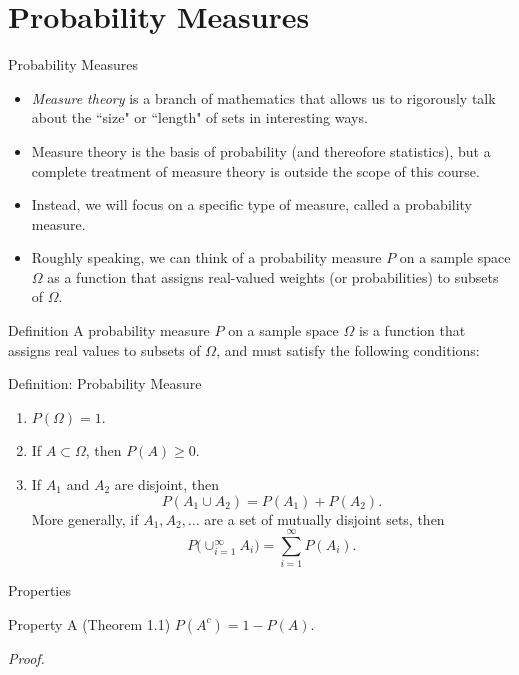 \section{Probability Measures}

\begin{frame}[allowframebreaks]{Probability Measures}
\begin{itemize}
  \item \emph{Measure theory} is a branch of mathematics that allows us to rigorously talk about the ``size" or ``length" of sets in interesting ways.
  \item Measure theory is the basis of probability (and thereofore statistics), but a complete treatment of measure theory is outside the scope of this course. 
  \item Instead, we will focus on a specific type of measure, called a \alert{probability measure}.
  \item Roughly speaking, we can think of a probability measure $P$ on a sample space $\Omega$ as a function that assigns real-valued weights (or probabilities) to subsets of $\Omega$.
\end{itemize}
\end{frame}

\begin{frame}{Definition}
    A probability measure $P$ on a sample space $\Omega$ is a function that assigns real values to subsets of $\Omega$, and must satisfy the following conditions:
  \begin{block}{Definition: Probability Measure}
    \begin{enumerate}
      \item $P(\Omega) = 1$. 
      \item If $A \subset \Omega$, then $P(A) \geq 0$.
      \item If $A_1$ and $A_2$ are disjoint, then
      $$
      P(A_1 \cup A_2) = P(A_1) + P(A_2).
      $$
      More generally, if $A_1, A_2, \ldots$ are a set of mutually disjoint sets, then
      $$
      P\big(\cup_{i = 1}^\infty A_i\big) = \sum_{i = 1}^\infty P(A_i).
      $$
    \end{enumerate}
  \end{block}
\end{frame}

\begin{frame}{Properties}
  \begin{block}{Property A (Theorem 1.1)}
    $P(A^c) = 1 - P(A)$.
  \end{block}
  \emph{Proof.}
  
  
\end{frame}

